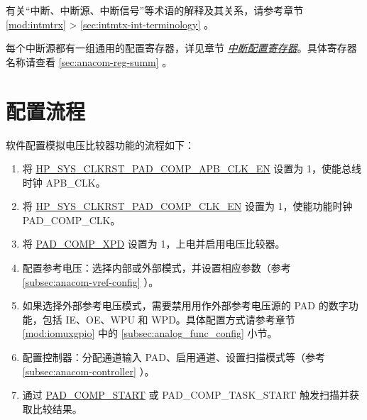 \documentclass[main\_\_CN.tex]{subfiles}
\begin{document}
\begin{tiplisting}
有关“中断、中断源、中断信号”等术语的解释及其关系，请参考章节 \ref{mod:intmtrx} \textit{} > \ref{sec:intmtx-int-terminology} \textit{}。
\end{tiplisting}

每个中断源都有一组通用的配置寄存器，详见章节 \hyperref[interrupt-config-registers]{\textit{中断配置寄存器}}。具体寄存器名称请查看 \ref{sec:anacom-reg-summ} \textit{}。



\section{配置流程}
\label{sec:anacom-prog-procedures}

软件配置模拟电压比较器功能的流程如下：


\begin{enumerate}
    \item 将 \hyperref[fielddesc:HPSYSCLKRSTPADCOMPAPBCLKEN]{HP\_SYS\_CLKRST\_PAD\_COMP\_APB\_CLK\_EN} 设置为 1，使能总线时钟 APB\_CLK。
    \item 将 \hyperref[fielddesc:HPSYSCLKRSTPADCOMPCLKEN]{HP\_SYS\_CLKRST\_PAD\_COMP\_CLK\_EN} 设置为 1，使能功能时钟 PAD\_COMP\_CLK。
    \item 将 \hyperref[fielddesc:PADCOMPXPD]{PAD\_COMP\_XPD} 设置为 1，上电并启用电压比较器。
    \item 配置参考电压：选择内部或外部模式，并设置相应参数（参考 \ref{subsec:anacom-vref-config} \textit{}）。    
    \item 如果选择外部参考电压模式，需要禁用用作外部参考电压源的 PAD 的数字功能，包括 IE、OE、WPU 和 WPD。具体配置方式请参考章节 \ref{mod:iomuxgpio} \textit{} 中的 \ref{subsec:analog_func_config} \textit{} 小节。
    \item 配置控制器：分配通道输入 PAD、启用通道、设置扫描模式等（参考 \ref{subsec:anacom-controller} \textit{}）。
    \item 通过 \hyperref[fielddesc:PADCOMPSTART]{PAD\_COMP\_START} 或 PAD\_COMP\_TASK\_START 触发扫描并获取比较结果。
\end{enumerate}



\end{document}
